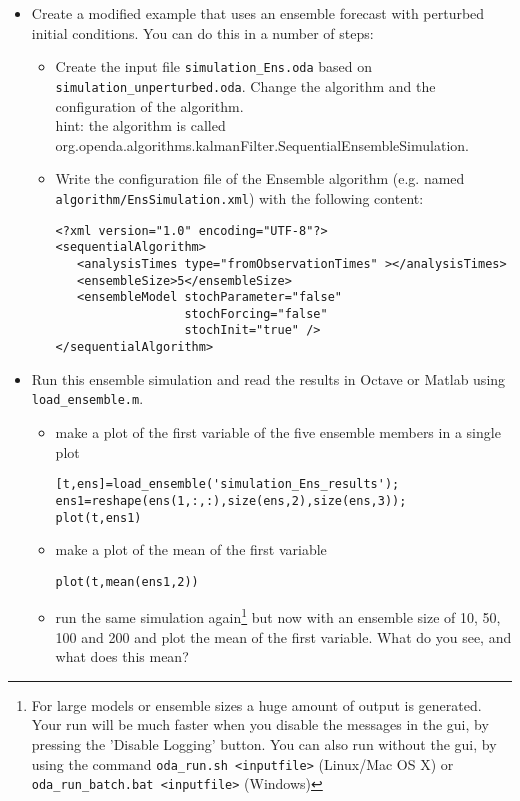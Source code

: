 \documentclass[a4paper,10pt]{article}
\begin{document}
\begin{itemize}
{\begin{verbatim}
       figure(2)
       plot(t1,xyz1(1,:),'b')
       hold on
       plot(t2,xyz2(1,:),'r')
       hold off
       legend('unperturbed','perturbed')
\end{verbatim}
}

\item Create a modified example that uses an ensemble forecast with perturbed
      initial conditions. You can do this in a number of steps:
      \begin{itemize}
      \item Create the input file {\tt simulation\_Ens.oda} based on\\
            {\tt simulation\_unperturbed.oda}. Change the algorithm and the
            configuration of the algorithm.\\
            hint: the algorithm is called \\
            org.openda.algorithms.kalmanFilter.SequentialEnsembleSimulation.
      \item Write the configuration file of the Ensemble algorithm (e.g. named
            {\tt algorithm/EnsSimulation.xml}) with the following content:
{\footnotesize
\begin{verbatim}
<?xml version="1.0" encoding="UTF-8"?>
<sequentialAlgorithm>
   <analysisTimes type="fromObservationTimes" ></analysisTimes>
   <ensembleSize>5</ensembleSize>
   <ensembleModel stochParameter="false"
                  stochForcing="false"
                  stochInit="true" />
</sequentialAlgorithm>
\end{verbatim}
}
      \end{itemize}
\item Run this ensemble simulation and read the results in Octave or
      Matlab using {\tt load\_ensemble.m}.
      \begin{itemize}
      \item make a plot of the first variable of the five ensemble
            members in a single plot
{\footnotesize
\begin{verbatim}
[t,ens]=load_ensemble('simulation_Ens_results');
ens1=reshape(ens(1,:,:),size(ens,2),size(ens,3));
plot(t,ens1)
\end{verbatim}
}
      \item make a plot of the mean of the first variable
{\footnotesize
\begin{verbatim}
plot(t,mean(ens1,2))
\end{verbatim}
}
      \item run the same simulation again\footnote{For large models or
            ensemble sizes a huge amount of output is generated. Your
            run will be much faster when you disable the messages in
            the gui, by pressing the 'Disable Logging' button.
            You can also run without the gui, by using the command
            {\tt oda\_run.sh <inputfile>} (Linux/Mac OS X) or
            {\tt oda\_run\_batch.bat <inputfile>} (Windows)}
            but now with an ensemble size of 10, 50, 100 and 200 and
            plot the mean of the first variable. What do you see, and
            what does this mean?
      \end{itemize}
\end{itemize}
\end{document}
